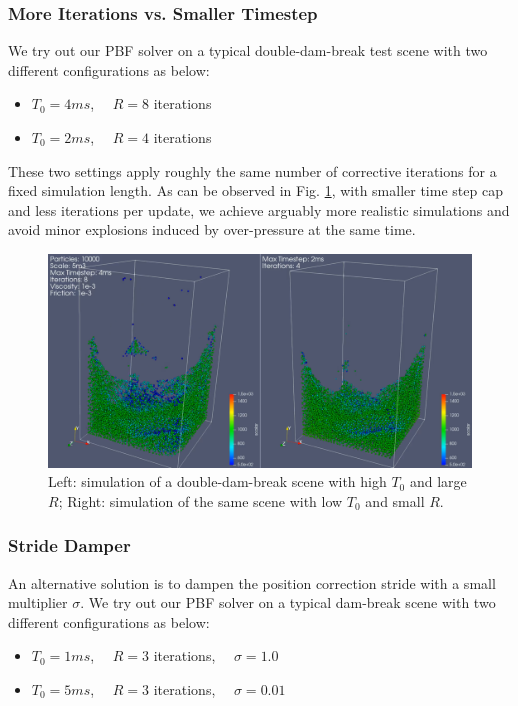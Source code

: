 \documentclass[
	11pt, 
	DIV10,
	ngerman,
	a4paper, 
	oneside, 
	headings=normal, 
	captions=tableheading,
	final, 
	numbers=noenddot
]{scrartcl}
\begin{document}
\subsubsection{More Iterations vs. Smaller Timestep}

We try out our PBF solver on a typical double-dam-break test scene with two different configurations as below:

\begin{itemize}
    \item $ T_{0} = 4ms $, $ \quad R = 8 $ iterations
    \item $ T_{0} = 2ms $, $ \quad R = 4 $ iterations
\end{itemize}

These two settings apply roughly the same number of corrective iterations for a fixed simulation length. As can be observed in Fig. \ref{fig:doubleDam}, with smaller time step cap and less iterations per update, we achieve arguably more realistic simulations and avoid minor explosions induced by over-pressure at the same time.

\begin{figure}[h]
    \centering
    \includegraphics[width=.6\textwidth]{pics/pbf_iter_ts.png}
    \caption{Left: simulation of a double-dam-break scene with high $ T_{0} $ and large $ R $; Right: simulation of the same scene with low $ T_{0} $ and small $ R $.}
    \label{fig:doubleDam}
\end{figure}

\subsubsection{Stride Damper}

An alternative solution is to dampen the position correction stride with a small multiplier $ \sigma $. We try out our PBF solver on a typical dam-break scene with two different configurations as below:

\begin{itemize}
    \item $ T_{0} = 1ms $, $ \quad R = 3 $ iterations, $ \quad \sigma = 1.0 $
    \item $ T_{0} = 5ms $, $ \quad R = 3 $ iterations, $ \quad \sigma = 0.01 $
\end{itemize}
\end{document}
